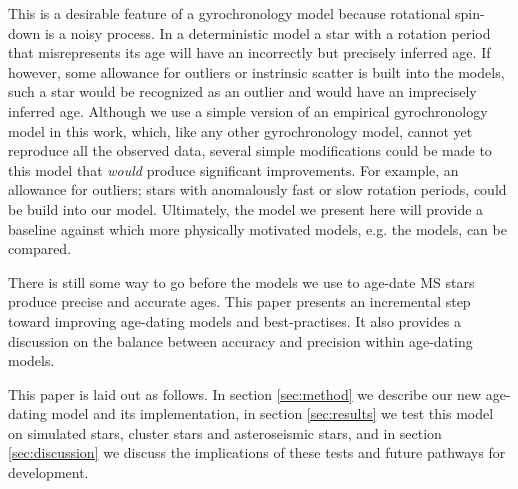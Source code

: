 This is a desirable feature of a gyrochronology model because rotational
spin-down is a noisy process.
In a deterministic model a star with a rotation period that misrepresents its
age will have an incorrectly but precisely inferred age.
If however, some allowance for outliers or instrinsic scatter is built into
the models, such a star would be recognized as an outlier and would have an
imprecisely inferred age.
Although we use a simple version of an empirical gyrochronology model in this
work, which, like any other gyrochronology model, cannot yet reproduce all the
observed data, several simple modifications could be made to this model that
{\it would} produce significant improvements.
For example, an allowance for outliers; stars with anomalously fast or slow
rotation periods, could be build into our model.
Ultimately, the model we present here will provide a baseline against which
more physically motivated models, e.g. the \citet{vansaders2016} models, can
be compared.



There is still some way to go before the models we use to age-date
MS stars produce precise and accurate ages.
This paper presents an incremental step toward improving age-dating models and
best-practises.
It also provides a discussion on the balance between accuracy and precision
within age-dating models.

This paper is laid out as follows.
In section \ref{sec:method} we describe our new age-dating model and its
implementation, in section \ref{sec:results} we test this model on simulated
stars, cluster stars and asteroseismic stars, and in section
\ref{sec:discussion} we discuss the implications of these tests and future
pathways for development.
